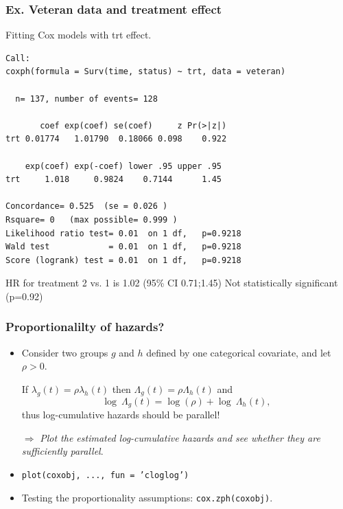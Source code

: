 \documentclass[12pt]{beamer}
\begin{document}
\begin{frame}[fragile]
\frametitle{Ex. Veteran data and treatment effect}

Fitting Cox models with trt effect.
\scriptsize
\begin{verbatim}
Call:
coxph(formula = Surv(time, status) ~ trt, data = veteran)

  n= 137, number of events= 128 

       coef exp(coef) se(coef)     z Pr(>|z|)
trt 0.01774   1.01790  0.18066 0.098    0.922

    exp(coef) exp(-coef) lower .95 upper .95
trt     1.018     0.9824    0.7144      1.45

Concordance= 0.525  (se = 0.026 )
Rsquare= 0   (max possible= 0.999 )
Likelihood ratio test= 0.01  on 1 df,   p=0.9218
Wald test            = 0.01  on 1 df,   p=0.9218
Score (logrank) test = 0.01  on 1 df,   p=0.9218
\end{verbatim}
\normalsize
HR for treatment 2 vs. 1 is 1.02 (95\% CI 0.71;1.45) \newline
Not statistically significant (p=0.92)
\end{frame}



\begin{frame}
\frametitle{Proportionalilty of hazards?}
\begin{itemize}
\item
Consider two groups $g$ and $h$ defined by one categorical covariate, and let $\rho > 0$. 

\medskip
If $\lambda_g(t) = \rho \lambda_h(t)$  then 
$\Lambda_g (t) = \rho \Lambda_h(t)$ and
$$ \log\: \Lambda_g  (t)  = \log (\rho) + \log\: \Lambda_h (t), $$
thus log-cumulative hazards should be parallel!
\bigskip
\item[$\Rightarrow$] 
\textit{Plot the estimated log-cumulative hazards and see
whether they are sufficiently parallel}.
\bigskip
\item
\texttt{plot(coxobj, ..., fun = 'cloglog')}
\medskip
\item
Testing the proportionality assumptions: \texttt{cox.zph(coxobj)}.
\end{itemize}
\end{frame}
\end{document}
